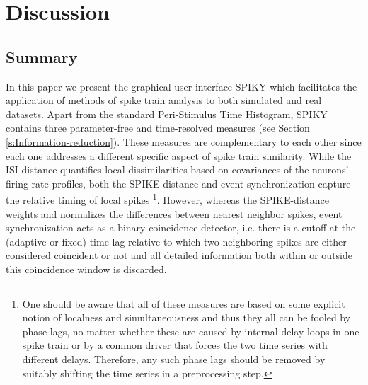 \documentclass[10pt,twocolumn]{elsart5p}
\begin{document}
%




%
%
\section{\label{s:Discussion} Discussion}

\subsection{\label{ss:Summary} Summary}

In this paper we present the graphical user interface SPIKY which facilitates the application of methods of spike train analysis to both simulated and real datasets. Apart from the standard Peri-Stimulus Time Histogram, SPIKY contains three parameter-free and time-resolved measures (see Section \ref{s:Information-reduction}). These measures are complementary to each other since each one addresses a different specific aspect of spike train similarity. While the ISI-distance quantifies local dissimilarities based on covariances of the neurons’ firing rate profiles, both the SPIKE-distance and event synchronization capture the relative timing of local spikes \footnote{One should be aware that all of these measures are based on some explicit notion of localness and simultaneousness and thus they all can be fooled by phase lags, no matter whether these are caused by internal delay loops in one spike train or by a common driver that forces the two time series with different delays. Therefore, any such phase lags should be removed by suitably shifting the time series in a preprocessing step.}. However, whereas the SPIKE-distance weights and normalizes the differences between nearest neighbor spikes, event synchronization acts as a binary coincidence detector, i.e. there is a cutoff at the (adaptive or fixed) time lag relative to which two neighboring spikes are either considered coincident or not and all detailed information both within or outside this coincidence window is discarded.
\end{document}

